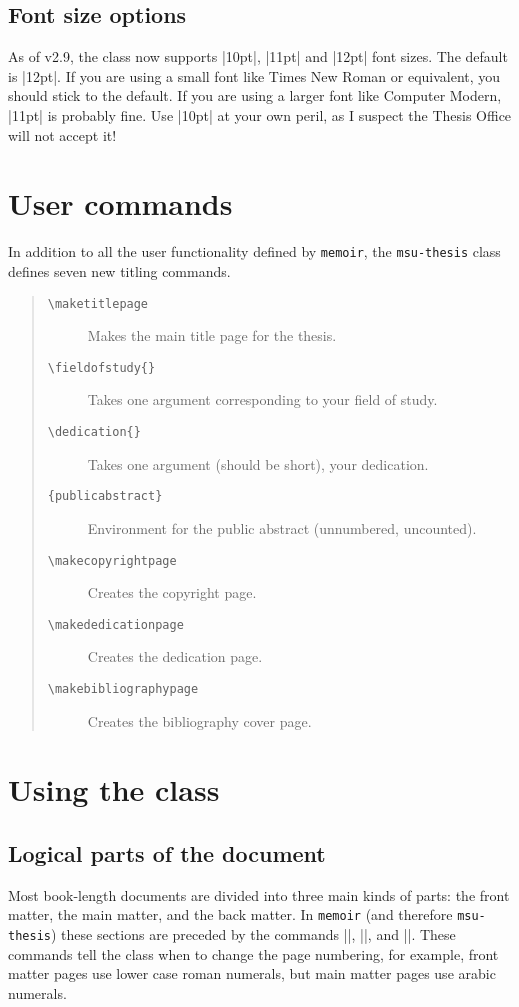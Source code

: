 \documentclass[11pt]{article}
\newcommand*\bs{\textbackslash}
\newcommand*{\pkg}[1]{\texttt{#1}\xspace}
\begin{document}
\subsection{Font size options}\label{fontsize}
As of v2.9, the class now supports |10pt|, |11pt| and |12pt| font sizes. The default is |12pt|. If you are using a small font like Times New Roman or equivalent, you should stick to the default. If you are using a larger font like Computer Modern, |11pt| is probably fine. Use |10pt| at your own peril, as I suspect the Thesis Office will not accept it!

\section{User commands}
In addition to all the user functionality defined by \pkg{memoir}, the \pkg{msu-thesis} class defines seven new titling commands. 
\begin{quote}
\begin{description}
\item[\texttt{\bs maketitlepage}] Makes the main title page for the thesis.
\item[\texttt{\bs fieldofstudy\{\}}] Takes one argument corresponding to your field of study.
\item[\texttt{\bs dedication\{\}}] Takes one argument (should be short), your dedication.
\item[\texttt{\{publicabstract\}}] Environment for the public abstract (unnumbered, uncounted).
\item[\texttt{\bs makecopyrightpage}] Creates the copyright page.
\item[\texttt{\bs makededicationpage}] Creates the dedication page.
\item[\texttt{\bs makebibliographypage}] Creates the bibliography cover page.
\end{description}
\end{quote}
\section{Using the class}
\subsection{Logical parts of the document}

Most book-length documents are divided into three main kinds of parts: the front matter, the main matter, and the back matter.  In \pkg{memoir} (and therefore \pkg{msu-thesis}) these sections are preceded by the commands |\frontmatter|, |\mainmatter|, and |\backmatter|.  These commands tell the class when to change the page numbering, for example, front matter pages  use lower case roman numerals, but main matter pages use arabic numerals.
\end{document}
